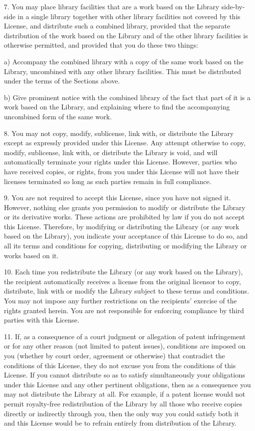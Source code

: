 \begin{DoxyCode}
  7. You may place library facilities that are a work based on the
Library side-by-side in a single library together with other library
facilities not covered by this License, and distribute such a combined
library, provided that the separate distribution of the work based on
the Library and of the other library facilities is otherwise
permitted, and provided that you do these two things:

    a) Accompany the combined library with a copy of the same work
    based on the Library, uncombined with any other library
    facilities.  This must be distributed under the terms of the
    Sections above.

    b) Give prominent notice with the combined library of the fact
    that part of it is a work based on the Library, and explaining
    where to find the accompanying uncombined form of the same work.

  8. You may not copy, modify, sublicense, link with, or distribute
the Library except as expressly provided under this License.  Any
attempt otherwise to copy, modify, sublicense, link with, or
distribute the Library is void, and will automatically terminate your
rights under this License.  However, parties who have received copies,
or rights, from you under this License will not have their licenses
terminated so long as such parties remain in full compliance.

  9. You are not required to accept this License, since you have not
signed it.  However, nothing else grants you permission to modify or
distribute the Library or its derivative works.  These actions are
prohibited by law if you do not accept this License.  Therefore, by
modifying or distributing the Library (or any work based on the
Library), you indicate your acceptance of this License to do so, and
all its terms and conditions for copying, distributing or modifying
the Library or works based on it.

  10. Each time you redistribute the Library (or any work based on the
Library), the recipient automatically receives a license from the
original licensor to copy, distribute, link with or modify the Library
subject to these terms and conditions.  You may not impose any further
restrictions on the recipients' exercise of the rights granted herein.
You are not responsible for enforcing compliance by third parties with
this License.

  11. If, as a consequence of a court judgment or allegation of patent
infringement or for any other reason (not limited to patent issues),
conditions are imposed on you (whether by court order, agreement or
otherwise) that contradict the conditions of this License, they do not
excuse you from the conditions of this License.  If you cannot
distribute so as to satisfy simultaneously your obligations under this
License and any other pertinent obligations, then as a consequence you
may not distribute the Library at all.  For example, if a patent
license would not permit royalty-free redistribution of the Library by
all those who receive copies directly or indirectly through you, then
the only way you could satisfy both it and this License would be to
refrain entirely from distribution of the Library.


\end{DoxyCode}
